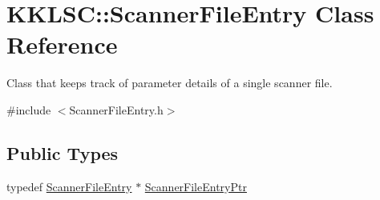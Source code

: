 \hypertarget{class_k_k_l_s_c_1_1_scanner_file_entry}{}\section{K\+K\+L\+SC\+:\+:Scanner\+File\+Entry Class Reference}
\label{class_k_k_l_s_c_1_1_scanner_file_entry}


Class that keeps track of parameter details of a single scanner file.  




{\ttfamily \#include $<$Scanner\+File\+Entry.\+h$>$}

\subsection*{Public Types}
\begin{DoxyCompactItemize}
\item 
typedef \hyperlink{class_k_k_l_s_c_1_1_scanner_file_entry}{Scanner\+File\+Entry} $\ast$ \hyperlink{class_k_k_l_s_c_1_1_scanner_file_entry_a5527b55d7c937f3d6eddfdbadedb3839}{Scanner\+File\+Entry\+Ptr}
\end{DoxyCompactItemize}
